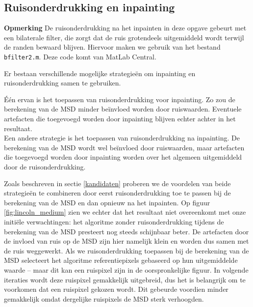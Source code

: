 \documentclass[titlepage]{article}
\newenvironment{note}{\textbf{Opmerking}}{}
\begin{document}

\subsection{Ruisonderdrukking en inpainting} %
\label{ruisonderdrukking_en_inpaintig}
\begin{note}
De ruisonderdrukking na het inpainten in deze opgave gebeurt met een bilaterale filter, die zorgt dat de ruis grotendeels uitgemiddeld wordt terwijl de randen bewaard blijven. Hiervoor maken we gebruik van het bestand \texttt{bfilter2.m}. Deze code komt van MatLab Central.
\end{note}

Er bestaan verschillende mogelijke strategie\"en om inpainting en ruisonderdrukking samen te gebruiken.

\'E\'en ervan is het toepassen van ruisonderdrukking voor inpainting. Zo zou de berekening van de MSD minder be\"invloed worden door ruiswaarden. Eventuele artefacten die toegevoegd worden door inpainting blijven echter achter in het resultaat.\\
Een andere strategie is het toepassen van ruisonderdrukking na inpainting. De berekening van de MSD wordt wel be\"invloed door ruiswaarden, maar artefacten die toegevoegd worden door inpainting worden over het algemeen uitgemiddeld door de ruisonderdrukking.

Zoals beschreven in sectie \ref{kandidaten} proberen we de voordelen van beide strategie\"en te combineren door eerst ruisonderdrukking toe te passen bij de berekening van de MSD en dan opnieuw na het inpainten. Op figuur \ref{fig:lincoln_medium} zien we echter dat het resultaat niet overeenkomt met onze initi\"ele verwachtingen: het algoritme zonder ruisonderdrukking tijdens de berekening van de MSD presteert nog steeds schijnbaar beter. De artefacten door de invloed van ruis op de MSD zijn hier namelijk klein en worden dus samen met de ruis weggewerkt. Als we ruisonderdrukking toepassen bij de berekening van de MSD selecteert het algoritme referentiepixels gebaseerd op hun uitgemiddelde waarde -- maar dit kan een ruispixel zijn in de oorspronkelijke figuur. In volgende iteraties wordt deze ruispixel gemakkelijk uitgebreid, dus het is belangrijk om te voorkomen dat een ruispixel gekozen wordt. Dit gebeurde voordien minder gemakkelijk omdat dergelijke ruispixels de MSD sterk verhoogden.
\end{document}
